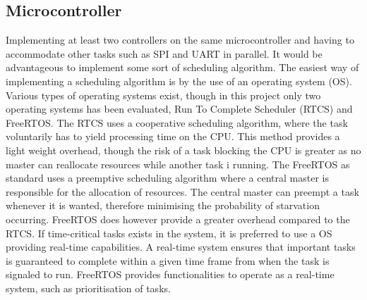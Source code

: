 \documentclass[../../main.tex]{subfiles}
\begin{document}
\subsection*{Microcontroller}
Implementing at least two controllers on the same microcontroller and having to accommodate other tasks such as SPI and UART in parallel. It would be advantageous to implement some sort of scheduling algorithm. The easiest way of implementing a scheduling algorithm is by the use of an operating system (OS). Various types of operating systems exist, though in this project only two operating systems has been evaluated, Run To Complete Scheduler (RTCS) and FreeRTOS. The RTCS uses a cooperative scheduling algorithm, where the task voluntarily has to yield processing time on the CPU. This method provides a light weight overhead, though the risk of a task blocking the CPU is greater as no master can reallocate resources while another task i running. 
The FreeRTOS as standard uses a preemptive scheduling algorithm where a central master is responsible for the allocation of resources. The central master can preempt a task whenever it is wanted, therefore minimising the probability of starvation occurring. FreeRTOS does however provide a greater overhead compared to the RTCS. If time-critical tasks exists in the system, it is preferred to use a OS providing real-time capabilities. A real-time system ensures that important tasks is guaranteed to complete within a given time frame from when the task is signaled to run. FreeRTOS provides functionalities to operate as a real-time system, such as prioritisation of tasks.   





\end{document}
